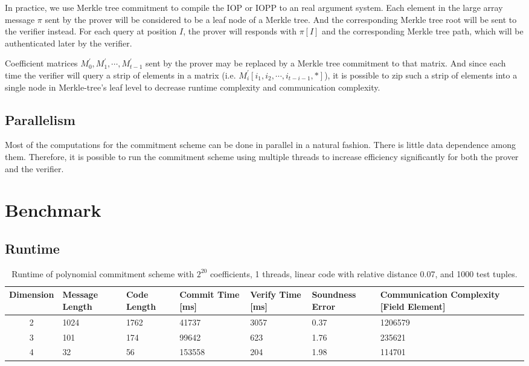 In practice, we use Merkle tree commitment to compile the IOP or IOPP to an real argument system. Each element in the large array message $\pi$ sent by the prover will be considered to be a leaf node of a Merkle tree. And the corresponding Merkle tree root will be sent to the verifier instead. For each query at position $I$, the prover will responds with $\pi[I]$ and the corresponding Merkle tree path, which will be authenticated later by the verifier.

Coefficient matrices $M_0^\prime, M_1^\prime, \cdots, M_{t-1}^\prime$ sent by the prover may be replaced by a Merkle tree commitment to that matrix. And since each time the verifier will query a strip of elements in a matrix (i.e. $M_i^\prime[i_1, i_2, \cdots, i_{t-i-1}, *]$), it is possible to zip such a strip of elements into a single node in Merkle-tree's leaf level to decrease runtime complexity and communication complexity.

\subsection{Parallelism}

Most of the computations for the commitment scheme can be done in parallel in a natural fashion. There is little data dependence among them. Therefore, it is possible to run the commitment scheme using multiple threads to increase efficiency significantly for both the prover and the verifier.


\section{Benchmark}

\subsection{Runtime}


\begin{table}[h!]
\centering
\begin{tabular}{| c | m{4em}  | m{3em}  | m{3.5em} | m{2.5em} | m{5em} | m{7em} |} 
 \hline
 Dimension & Message Length & Code Length & Commit Time [ms] & Verify Time [ms] & Soundness Error & Communication Complexity [Field Element] \\ [0.5ex] 
 \hline\hline
 2 & 1024   & 1762 & 41737  & 3057  & 0.37 & 1206579 \\
 \hline
 3 & 101    & 174 & 99642  & 623  & 1.76 & 235621  \\
 \hline
 4 & 32     & 56 & 153558  & 204  & 1.98 & 114701   \\
 \hline
\end{tabular}
\caption{Runtime of polynomial commitment scheme with $2^{20}$ coefficients, 1 threads, linear code with relative distance 0.07, and 1000 test tuples.}
\label{table:benchmark-pc-1}
\end{table}


